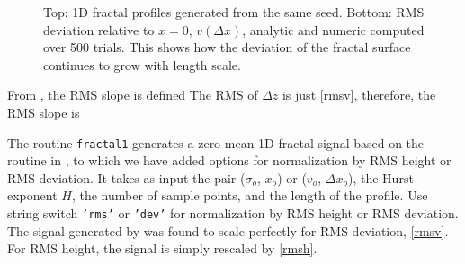 \begin{figure}[H] 
   \centering
   \caption{Top: 1D fractal profiles generated from the same seed.  Bottom: RMS deviation relative to $x = 0$, $v(\Delta x)$, analytic and numeric computed over 500 trials. This shows how the deviation of the fractal surface continues to grow with length scale. }
\end{figure}


From \cite{shepard1995self}, the RMS slope is defined
The RMS of $\Delta z$ is just \eqref{rmsv}, therefore, the RMS slope is


%



The routine \texttt{fractal1} generates a zero-mean 1D fractal signal based on the routine in \cite{kroese2015spatial}, to which we have added options for normalization by RMS height or RMS deviation. It takes as input the pair ($\sigma_o$, $x_o$) or ($v_o$, $\Delta x_o$), the Hurst exponent $H$, the number of sample points, and the length of the profile. Use string switch \texttt{'rms'} or \texttt{'dev'} for normalization by RMS height or RMS deviation. The signal generated by \cite{kroese2015spatial} was found to scale perfectly for RMS deviation, \eqref{rmsv}. For RMS height, the signal is simply rescaled by \eqref{rmsh}. 


